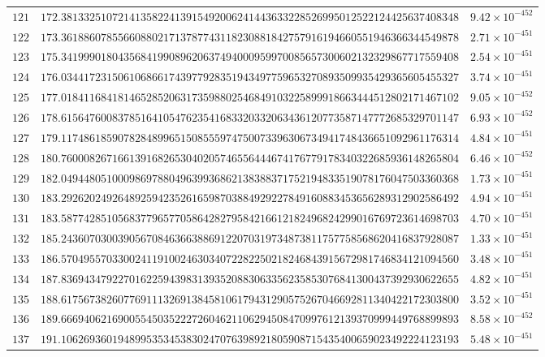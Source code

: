 \documentclass[12pt,reqno]{amsart}
\theoremstyle{remark}
\begin{document}
\begin{longtable}{clc}
$121$ & $172.3813325107214135822413915492006241443633228526995012522124425637408348$ & $9.42\times 10^{-452}$ \\
$122$ & $173.3618860785566088021713787743118230881842757916194660551946366344549878$ & $2.71\times 10^{-451}$ \\
$123$ & $175.3419990180435684199089620637494000959970085657300602132329867717559408$ & $2.54\times 10^{-451}$ \\
$124$ & $176.0344172315061068661743977928351943497759653270893509935429365605455327$ & $3.74\times 10^{-451}$ \\
$125$ & $177.0184116841814652852063173598802546849103225899918663444512802171467102$ & $9.05\times 10^{-452}$ \\
$126$ & $178.6156476008378516410547623541683320332063436120773587147772685329701147$ & $6.93\times 10^{-452}$ \\
$127$ & $179.1174861859078284899651508555974750073396306734941748436651092961176314$ & $4.84\times 10^{-451}$ \\
$128$ & $180.7600082671661391682653040205746556444674176779178340322685936148265804$ & $6.46\times 10^{-452}$ \\
$129$ & $182.0494480510009869788049639936862138388371752194833519078176047503360368$ & $1.73\times 10^{-451}$ \\
$130$ & $183.2926202492648925942352616598703884929227849160883453656289312902586492$ & $4.94\times 10^{-451}$ \\
$131$ & $183.5877428510568377965770586428279584216612182496824299016769723614698703$ & $4.70\times 10^{-451}$ \\
$132$ & $185.2436070300390567084636638869122070319734873811757758568620416837928087$ & $1.33\times 10^{-451}$ \\
$133$ & $186.5704955703300241191002463034072282250218246843915672981746834121094560$ & $3.48\times 10^{-451}$ \\
$134$ & $187.8369434792270162259439831393520883063356235853076841300437392930622655$ & $4.82\times 10^{-451}$ \\
$135$ & $188.6175673826077691113269138458106179431290575267046692811340422172303800$ & $3.52\times 10^{-451}$ \\
$136$ & $189.6669406216900554503522272604621106294508470997612139370999449768899893$ & $8.58\times 10^{-452}$ \\
$137$ & $191.1062693601948995353453830247076398921805908715435400659023492224123193$ & $5.48\times 10^{-451}$ \\

\end{longtable}
\end{document}
